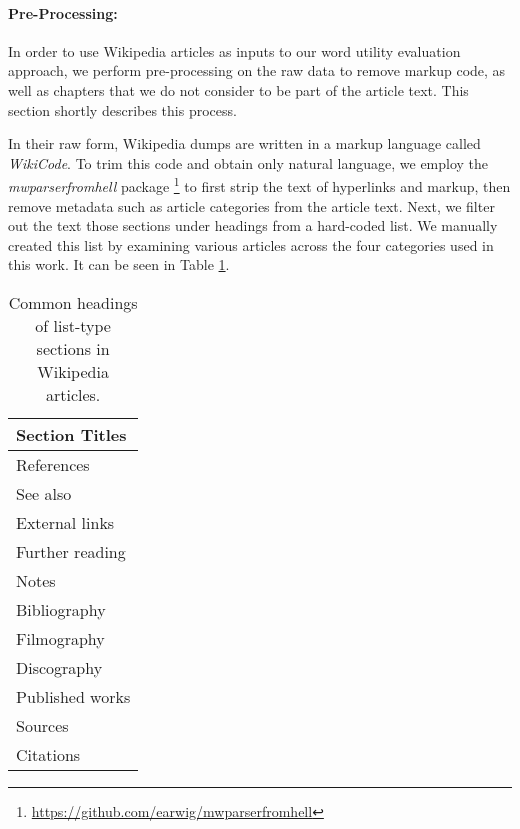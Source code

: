 

\paragraph{Pre-Processing:} \label{sec:wikipedia-preprocessing}
In order to use Wikipedia articles as inputs to our word utility evaluation approach, we perform pre-processing on the raw data to remove markup code, as well as chapters that we do not consider to be part of the article text.
This section shortly describes this process.

In their raw form, Wikipedia dumps are written in a markup language called \textit{WikiCode}.
To trim this code and obtain only natural language, we employ the \textit{mwparserfromhell} package \footnote{\url{https://github.com/earwig/mwparserfromhell}} to first strip the text of hyperlinks and markup, then remove metadata such as article categories from the article text.
Next, we filter out the text those sections under headings from a hard-coded list.
We manually created this list by examining various articles across the four categories used in this work.
It can be seen in Table \ref{tbl:wikipedia-ignored-headings}.

\begin{table}[H]
	\centering
	\begin{tabular}{|l|}
		\hline
		\textbf{Section Titles} \\
		\hline
		References              \\
		See also                \\
		External links          \\
		Further reading         \\
		Notes                   \\
		Bibliography            \\
		Filmography             \\
		Discography             \\
		Published works         \\
		Sources                 \\
		Citations               \\
		\hline
	\end{tabular}
	\caption{Common headings of list-type sections in Wikipedia articles.}
	\label{tbl:wikipedia-ignored-headings}
\end{table}

